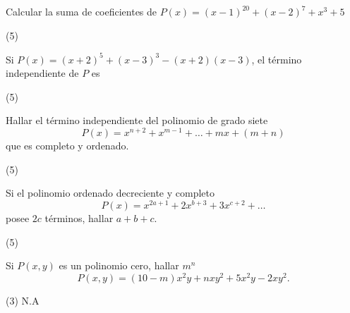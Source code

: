 \begin{multicols}{2}
    \begin{exercise}
        Calcular la suma de coeficientes de $P(x) = (x - 1)^{20} + (x - 2)^7 + x^3 + 5$
        \begin{tasks}[label=\Alph*)](5)
        \end{tasks}
    \end{exercise}

    \begin{exercise}
        Si $P(x) = (x + 2)^5 + (x - 3)^3 - (x + 2)(x - 3)$, el término independiente de $P$ es
        \begin{tasks}[label=\Alph*)](5)
        \end{tasks}
    \end{exercise}

    \begin{exercise}
        Hallar el término independiente del polinomio de grado siete
        \[
            P(x) = x^{n + 2} + x^{m - 1} + \ldots + mx + (m + n)
        \]
        que es completo y ordenado.
        \begin{tasks}[label=\Alph*)](5)
        \end{tasks}
    \end{exercise}

    \begin{exercise}
        Si el polinomio ordenado decreciente y completo
        \[
            P(x) = x^{2a + 1} + 2x^{b + 3} + 3x^{c + 2} + \ldots
        \]
        posee $2c$ términos, hallar $a + b + c$.
        \begin{tasks}[label=\Alph*)](5)
        \end{tasks}
    \end{exercise}

    \begin{exercise}
        Si $P(x, y)$ es un polinomio cero, hallar $m^n$
        \[
            P(x, y) = (10 - m)x^2 y + nxy^2 + 5x^2 y - 2xy^2.
        \]
        \begin{tasks}[label=\Alph*)](3)
        \task N.A
        \end{tasks}
    \end{exercise}



\end{multicols}
